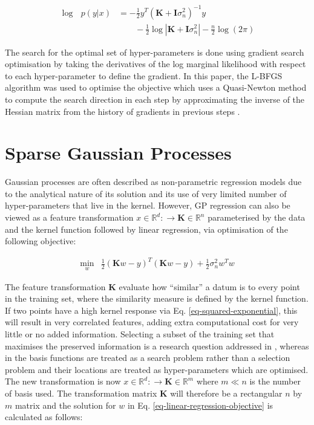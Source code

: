 \documentclass[useAMS,usenatbib,fleqn]{mn2e}
\newcommand{\bm}[1]{\mathbf{#1} }
\begin{document}
\begin{align}
\label{eq-log-marginal-likelihood}
\log\text{ }p(y|x) &= -\frac{1}{2}y^{T}\left(\bm{K}+\bm{I}\sigma_{n}^{2} \right)^{-1}y \nonumber \\
&\qquad -\frac{1}{2} \log\left | \bm{K}+\bm{I}\sigma_{n}^{2}\right|-\frac{n}{2}\log(2\pi)
\end{align}

The search for the optimal set of hyper-parameters is done using gradient search optimisation by taking the derivatives of the log marginal likelihood with respect to each hyper-parameter to define the gradient. In this paper, the L-BFGS algorithm was used to optimise the objective which uses a Quasi-Newton method to compute the search direction in each step by approximating the inverse of the Hessian matrix from the history of gradients in previous steps  \citep{jorge1980}.

\section{Sparse Gaussian Processes}
\label{sec-sparse-gaussian-processes}
Gaussian processes are often described as non-parametric regression models due to the analytical nature of its solution and its use of very limited number of hyper-parameters that live in the kernel. However, GP regression can also be viewed as a feature transformation $x\in \mathbb{R}^{d}:\rightarrow \bm{K}\in \mathbb{R}^{n}$ parameterised by the data and the kernel function followed by linear regression, via optimisation of the following objective:

\begin{equation}
\label{eq-linear-regression-objective}
\begin{array}{lcl}
\underset{w}{\text{min}} &\frac{1}{2}\left ( \bm{K}w-y \right )^{T}\left( \bm{K}w-y \right )+\frac{1}{2}\sigma_{n}^{2}w^{T}w
\end{array}
\end{equation}

The feature transformation $\bm{K}$ evaluate how ``similar'' a datum is to every point in the training set, where the similarity measure is defined by the kernel function. If two points have a high kernel response via  Eq. \eqref{eq-squared-exponential}, this will result in very correlated features, adding extra computational cost for very little or no added information. Selecting a subset of the training set that maximises the preserved information is a research question addressed in \citep{foster2009}, whereas in \citep{snelson2005} the basis functions are treated as a search problem rather than a selection problem and their locations are treated as hyper-parameters which are optimised. The new transformation is now $x\in \mathbb{R}^{d}:\rightarrow \bm{K}\in \mathbb{R}^{m}$ where $m\ll n$ is the number of basis used. The transformation matrix $\bm{K}$ will therefore be a rectangular $n$ by $m$ matrix and the solution for $w$ in  Eq. \eqref{eq-linear-regression-objective} is calculated as follows:
\end{document}
